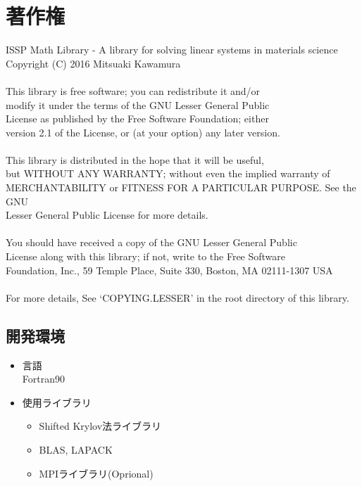 \documentclass[12pt,titlepage]{jarticle}
\begin{document}
\section{著作権}

\noindent
ISSP Math Library - A library for solving linear systems in materials science \\
Copyright (C) 2016 Mitsuaki Kawamura \\
 \\
This library is free software; you can redistribute it and/or \\
modify it under the terms of the GNU Lesser General Public \\
License as published by the Free Software Foundation; either \\
version 2.1 of the License, or (at your option) any later version. \\
 \\
This library is distributed in the hope that it will be useful, \\
but WITHOUT ANY WARRANTY; without even the implied warranty of \\
MERCHANTABILITY or FITNESS FOR A PARTICULAR PURPOSE.  See the GNU \\
Lesser General Public License for more details. \\
 \\
You should have received a copy of the GNU Lesser General Public \\
License along with this library; if not, write to the Free Software \\
Foundation, Inc., 59 Temple Place, Suite 330, Boston, MA  02111-1307  USA \\
 \\
For more details, See `COPYING.LESSER' in the root directory of this library.

\subsection{開発環境}

\begin{itemize}
\item{言語}\\
 Fortran90

 \item{使用ライブラリ}
   \begin{itemize}
   \item{Shifted Krylov法ライブラリ}
   \item{BLAS, LAPACK}
   \item{MPIライブラリ(Oprional)}
   \end{itemize}

\end{itemize}
\end{document}
